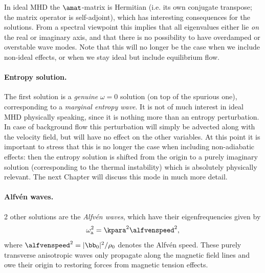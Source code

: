 In ideal MHD the $\amat$-matrix is Hermitian (i.e. its own conjugate transpose; the matrix operator is self-adjoint), which has interesting consequences for the solutions. From a spectral viewpoint this implies that all eigenvalues either lie \emph{on} the real or imaginary axis, and that there is no possibility to have overdamped or overstable wave modes. Note that this will no longer be the case when we include non-ideal effects, or when we stay ideal but include equilibrium flow.

\paragraph{Entropy solution.}
The first solution is a \emph{genuine} $\omega = 0$ solution (on top of the spurious one), corresponding to a \emph{marginal entropy wave}. It is not of much interest in ideal MHD physically speaking, since it is nothing more than an entropy perturbation. In case of background flow this perturbation will simply be advected along with the velocity field, but will have no effect on the other variables. At this point it is important to stress that this is no longer the case when including non-adiabatic effects: then the entropy solution is shifted from the origin to a purely imaginary solution (corresponding to the thermal instability) which is absolutely physically relevant. The next Chapter will discuss this mode in much more detail.

\paragraph{Alfv\'en waves.}
2 other solutions are the \emph{Alfv\'en waves}, which have their eigenfrequencies given by
\begin{equation} \label{eq: alfvenwaves}
  \omega_\text{a}^2 = \kpara^2 \alfvenspeed^2,
\end{equation}
where $\alfvenspeed^2 = |\bb_0|^2 / \rho_0$ denotes the Alfv\'en speed. These purely transverse anisotropic waves only propagate along the magnetic field lines and owe their origin to restoring forces from magnetic tension effects.

